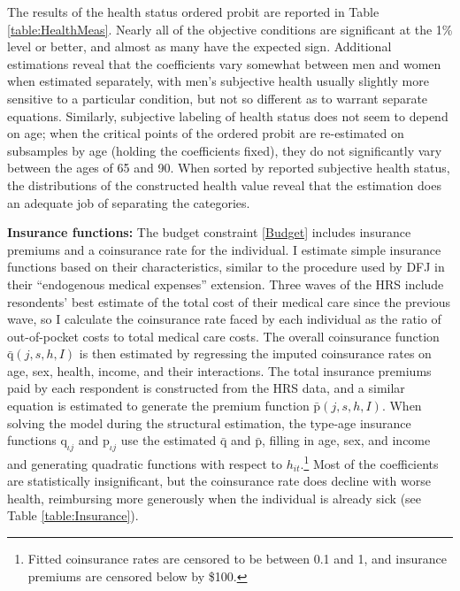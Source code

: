 \documentclass[12pt,pdftex,letterpaper]{article}
\newcommand{\Type}{\iota}
\newcommand{\Health}{h}
\newcommand{\Inc}{I}
\newcommand{\Premium}{p}
\newcommand{\Copay}{q}
\newcommand{\PremiumFunc}{\text{\Premium}}
\newcommand{\CopayFunc}{\text{\Copay}}
\newcommand{\Age}{j}
\newcommand{\Sex}{s}
\begin{document}
The results of the health status ordered probit are reported in Table \ref{table:HealthMeas}.  Nearly all of the objective conditions are significant at the 1\% level or better, and almost as many have the expected sign.  Additional estimations reveal that the coefficients vary somewhat between men and women when estimated separately, with men's subjective health usually slightly more sensitive to a particular condition, but not so different as to warrant separate equations.  Similarly, subjective labeling of health status does not seem to depend on age; when the critical points of the ordered probit are re-estimated on subsamples by age (holding the coefficients fixed), they do not significantly vary between the ages of 65 and 90.  When sorted by reported subjective health status, the distributions of the constructed health value reveal that the estimation does an adequate job of separating the categories.

\vspace{0.5cm}

\noindent \textbf{Insurance functions:} The budget constraint \eqref{Budget} includes insurance premiums and a coinsurance rate for the individual.  I estimate simple insurance functions based on their characteristics, similar to the procedure used by DFJ in their ``endogenous medical expenses'' extension.  Three waves of the HRS include resondents' best estimate of the total cost of their medical care since the previous wave, so I calculate the coinsurance rate faced by each individual as the ratio of out-of-pocket costs to total medical care costs.  The overall coinsurance function $\bar{\CopayFunc}(\Age,\Sex,\Health,\Inc)$ is then estimated by regressing the imputed coinsurance rates on age, sex, health, income, and their interactions.  The total insurance premiums paid by each respondent is constructed from the HRS data, and a similar equation is estimated to generate the premium function $\bar{\PremiumFunc}(\Age,\Sex,\Health,\Inc)$. When solving the model during the structural estimation, the type-age insurance functions $\CopayFunc_{\Type \Age}$ and $\PremiumFunc_{\Type \Age}$ use the estimated  $\bar{\CopayFunc}$ and $\bar{\PremiumFunc}$, filling in age, sex, and income and generating quadratic functions with respect to $\Health_{it}$.\footnote{Fitted coinsurance rates are censored to be between 0.1 and 1, and insurance premiums are censored below by \$100.}  Most of the coefficients are statistically insignificant, but the coinsurance rate does decline with worse health, reimbursing more generously when the individual is already sick (see Table \ref{table:Insurance}).
\end{document}
